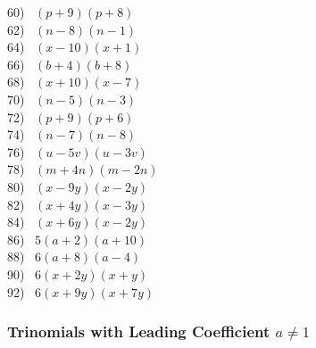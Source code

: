 \documentclass[12pt]{book}
\theoremstyle{definition}
\begin{document}
\begin{multicols}{3}
 60)~ $(p+9)(p+8)$\\
 62)~ $(n-8)(n-1)$\\
 64)~ $(x-10)(x+1)$\\
 66)~ $(b+4)(b+8)$\\
 68)~ $(x+10)(x-7)$\\
 70)~ $(n-5)(n-3)$\\
 72)~ $(p+9)(p+6)$\\
 74)~ $(n-7)(n-8)$\\
 76)~ $(u-5v)(u-3v)$\\
 78)~ $(m+4n)(m-2n)$\\
 80)~ $(x-9y)(x-2y)$\\
 82)~ $(x+4y)(x-3y)$\\
 84)~ $(x+6y)(x-2y)$\\
 86)~ $5(a+2)(a+10)$\\
 88)~ $6(a+8)(a-4)$\\
 90)~ $6(x+2y)(x+y)$\\
 92)~ $6(x+9y)(x+7y)$%
\end{multicols}

\subsubsection{Trinomials with Leading Coefficient $a\neq 1$}
\end{document}
